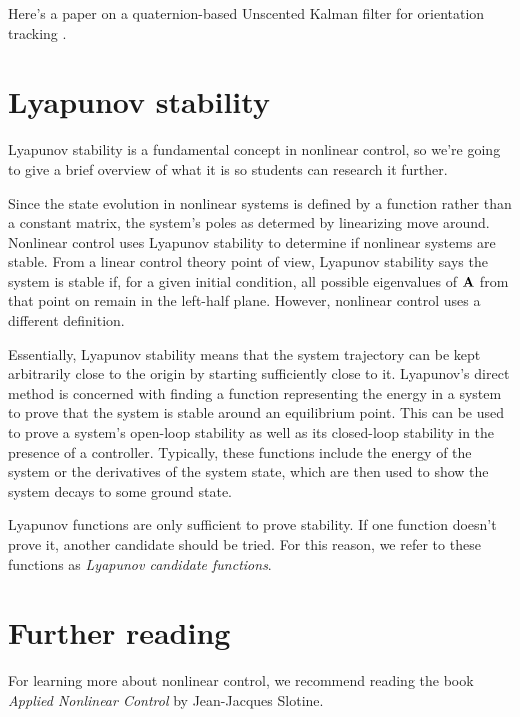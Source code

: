 Here's a paper on a quaternion-based Unscented Kalman filter for orientation
tracking \cite{bib:ukf-state-tracking}.

\section{Lyapunov stability}

Lyapunov stability is a fundamental concept in nonlinear control, so we're going
to give a brief overview of what it is so students can research it further.

Since the state evolution in nonlinear systems is defined by a function rather
than a constant matrix, the system's poles as determed by linearizing move
around. Nonlinear control uses Lyapunov stability to determine if nonlinear
systems are stable. From a linear control theory point of view, Lyapunov
stability says the system is stable if, for a given initial condition, all
possible eigenvalues of $\mathbf{A}$ from that point on remain in the left-half
plane. However, nonlinear control uses a different definition.

Essentially, Lyapunov stability means that the system trajectory can be kept
arbitrarily close to the origin by starting sufficiently close to it. Lyapunov's
direct method is concerned with finding a function representing the energy in a
system to prove that the system is stable around an equilibrium point. This can
be used to prove a system's open-loop stability as well as its closed-loop
stability in the presence of a controller. Typically, these functions include
the energy of the system or the derivatives of the system state, which are then
used to show the system decays to some ground state.

Lyapunov functions are only sufficient to prove stability. If one function
doesn't prove it, another candidate should be tried. For this reason, we refer
to these functions as \textit{Lyapunov candidate functions}.

\section{Further reading}

For learning more about nonlinear control, we recommend reading the book
\textit{Applied Nonlinear Control} by Jean-Jacques Slotine.
